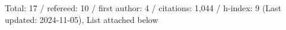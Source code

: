 Total: 17 / refereed: 10 / first author: 4 / citations: 1,044 / h-index: 9 (Last updated: 2024-11-05), List attached below